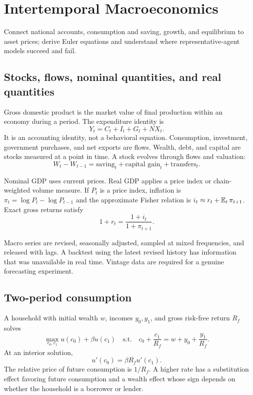 \chapter{Intertemporal Macroeconomics}

\begin{objectives}
Connect national accounts, consumption and saving, growth, and equilibrium to asset
prices; derive Euler equations and understand where representative-agent models
succeed and fail.
\end{objectives}

\section{Stocks, flows, nominal quantities, and real quantities}

Gross domestic product is the market value of final production within an economy
during a period. The expenditure identity is
\[
Y_t=C_t+I_t+G_t+NX_t.
\]
It is an accounting identity, not a behavioral equation. Consumption, investment,
government purchases, and net exports are flows. Wealth, debt, and capital are
stocks measured at a point in time. A stock evolves through flows and valuation:
\[
W_t-W_{t-1}=\text{saving}_t+\text{capital gain}_t+\text{transfers}_t.
\]

Nominal GDP uses current prices. Real GDP applies a price index or chain-weighted
volume measure. If $P_t$ is a price index, inflation is
$\pi_t=\log P_t-\log P_{t-1}$ and the approximate Fisher relation is
$i_t\approx r_t+\operatorname{\mathbb E}_t\pi_{t+1}$. Exact gross returns satisfy
\[
1+r_t=\frac{1+i_t}{1+\pi_{t+1}}.
\]

\begin{warning}
Macro series are revised, seasonally adjusted, sampled at mixed frequencies, and
released with lags. A backtest using the latest revised history has information that
was unavailable in real time. Vintage data are required for a genuine forecasting
experiment.
\end{warning}

\section{Two-period consumption}

A household with initial wealth $w$, incomes $y_0,y_1$, and gross risk-free return
$R_f$ solves
\[
\max_{c_0,c_1}u(c_0)+\beta u(c_1)
\quad\text{s.t.}\quad
c_0+\frac{c_1}{R_f}=w+y_0+\frac{y_1}{R_f}.
\]
At an interior solution,
\[
u'(c_0)=\beta R_f u'(c_1).
\]
The relative price of future consumption is $1/R_f$. A higher rate has a substitution
effect favoring future consumption and a wealth effect whose sign depends on whether
the household is a borrower or lender.

